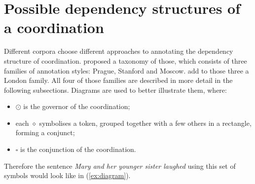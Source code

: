\section{Possible dependency structures of a coordination}\label{sec:coord annotations}

Different corpora choose different approaches to annotating the dependency structure of coordination. \cite{popel2013coordination} proposed a taxonomy of those, which consists of three families of annotation styles: Prague, Stanford and Moscow. \cite{prz:woz:23} add to those three a London family. All four of those families are described in more detail in the following subsections. Diagrams are used to better illustrate them, where:
\begin{itemize}
    \item $\odot$ is the governor of the coordination;
    \item each $\diamond$ symbolises a token, grouped together with a few others in a rectangle, forming a conjunct;
    \item $\square$ is the conjunction of the coordination.
\end{itemize}

Therefore the sentence \textsl{Mary and her younger sister laughed} using this set of symbols would look like in (\ref{ex:diagram}).

\begin{exe}
    \ex\label{ex:diagram}
\end{exe}

